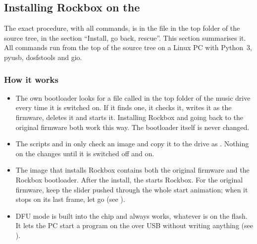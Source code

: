 \subsection{Installing Rockbox on the \playertype}


The exact procedure, with all commands, is in the file 
in the top folder of the source tree, in the section ``Install, go back,
rescue''. This section summarises it. All commands run
from the top of the source tree on a Linux PC with Python~3, pyusb,
dosfstools and gio.

\subsubsection{How it works}
\begin{itemize}
  \item The \daps{} own bootloader looks for a file called
     in the top folder of the music drive every time it is
    switched on. If it finds one, it checks it, writes it as the firmware,
    deletes it and starts it. Installing Rockbox and going back to the
    original firmware both work this way. The \playerman{} bootloader itself
    is never changed.
  \item The scripts  and  in
     only check an image and copy it to the drive
    as . Nothing on the \dap{} changes until it
    is switched off and on.
  \item The image that installs Rockbox contains both the original firmware
    and the Rockbox bootloader. After the install, the \dap{} starts Rockbox.
    For the original firmware, keep the \ButtonPower{} slider pushed through
    the whole start animation; when it stops on its last frame, let go (see
    ).
  \item DFU mode is built into the \daps{} chip and always works, whatever is
    on the flash. It lets the PC start a program on the \dap{} over USB without
    writing anything (see ).
\end{itemize}

